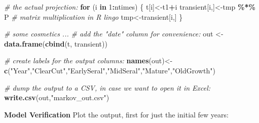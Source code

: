 \documentclass[
]{article}
\newenvironment{Shaded}{\begin{snugshade}}{\end{snugshade}}
\newcommand{\CommentTok}[1]{\textcolor[rgb]{0.56,0.35,0.01}{\textit{#1}}}
\newcommand{\ControlFlowTok}[1]{\textcolor[rgb]{0.13,0.29,0.53}{\textbf{#1}}}
\newcommand{\DecValTok}[1]{\textcolor[rgb]{0.00,0.00,0.81}{#1}}
\newcommand{\FunctionTok}[1]{\textcolor[rgb]{0.13,0.29,0.53}{\textbf{#1}}}
\newcommand{\NormalTok}[1]{#1}
\newcommand{\OtherTok}[1]{\textcolor[rgb]{0.56,0.35,0.01}{#1}}
\newcommand{\SpecialCharTok}[1]{\textcolor[rgb]{0.81,0.36,0.00}{\textbf{#1}}}
\newcommand{\StringTok}[1]{\textcolor[rgb]{0.31,0.60,0.02}{#1}}
\begin{document}
\begin{Shaded}
\begin{Highlighting}[]
\CommentTok{\# the actual projection:}
\ControlFlowTok{for}\NormalTok{ (i }\ControlFlowTok{in} \DecValTok{1}\SpecialCharTok{:}\NormalTok{ntimes) \{}
\NormalTok{    t[i]}\OtherTok{\textless{}{-}}\NormalTok{t1}\SpecialCharTok{+}\NormalTok{i}
\NormalTok{    transient[i,]}\OtherTok{\textless{}{-}}\NormalTok{tmp }\SpecialCharTok{\%*\%}\NormalTok{ P }\CommentTok{\# matrix multiplication in R lingo}
\NormalTok{    tmp}\OtherTok{\textless{}{-}}\NormalTok{transient[i,]}
\NormalTok{\}}

\CommentTok{\# some cosmetics ...}
\CommentTok{\# add the "date" column for convenience:}
\NormalTok{out }\OtherTok{\textless{}{-}} \FunctionTok{data.frame}\NormalTok{(}\FunctionTok{cbind}\NormalTok{(t, transient)) }
 
\CommentTok{\# create labels for the output columns:}
\FunctionTok{names}\NormalTok{(out)}\OtherTok{\textless{}{-}}\FunctionTok{c}\NormalTok{(}\StringTok{"Year"}\NormalTok{,}\StringTok{"ClearCut"}\NormalTok{,}\StringTok{"EarlySeral"}\NormalTok{,}\StringTok{"MidSeral"}\NormalTok{,}\StringTok{"Mature"}\NormalTok{,}\StringTok{"OldGrowth"}\NormalTok{)}

\CommentTok{\# dump the output to a CSV, in case we want to open it in Excel:}
\FunctionTok{write.csv}\NormalTok{(out,}\StringTok{"markov\_out.csv"}\NormalTok{)}
\end{Highlighting}
\end{Shaded}

\textbf{Model Verification} Plot the output, first for just the initial
few years:
\end{document}
